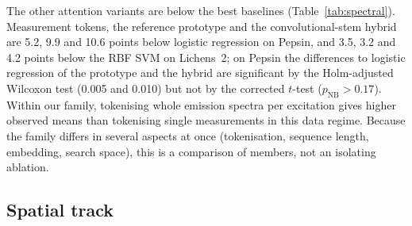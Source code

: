 \documentclass[journal]{IEEEtran}
\begin{document}
\begin{table}[!t]
\centering
\caption{Paired comparison of our attention variants and baselines, one block per dataset and track. First rows of each block: every attention variant against the strongest baseline (Holm across variants). Remaining rows: our best variant (marked $^*$, selected on the test units, hence optimistic) against every other baseline (Holm across baselines). $n$: units; $\bar d$: mean difference in balanced accuracy in points with bootstrap 95\% CI; W/T/L: wins, ties, losses; $p_{\mathrm{W}}$: Wilcoxon $p$ (unadjusted), $p_{\mathrm{NB}}$: Nadeau--Bengio corrected $t$-test $p$ (unadjusted), $p_{\mathrm{W}}^{\mathrm{Holm}}$: Holm-adjusted Wilcoxon $p$. With $n=4$ the smallest attainable two-sided Wilcoxon $p$ is 0.125.}
\label{tab:stats}
\scriptsize
\setlength{\tabcolsep}{3pt}

\end{table}

The other attention variants are below the best baselines (Table~\ref{tab:spectral}). Measurement tokens, the reference prototype and the convolutional-stem hybrid are 5.2, 9.9 and 10.6 points below logistic regression on Pepsin, and 3.5, 3.2 and 4.2 points below the RBF SVM on Lichens~2; on Pepsin the differences to logistic regression of the prototype and the hybrid are significant by the Holm-adjusted Wilcoxon test (0.005 and 0.010) but not by the corrected $t$-test ($p_{\mathrm{NB}}>0.17$). Within our family, tokenising whole emission spectra per excitation gives higher observed means than tokenising single measurements in this data regime. Because the family differs in several aspects at once (tokenisation, sequence length, embedding, search space), this is a comparison of members, not an isolating ablation.

\subsection{Spatial track}
\begin{table}[!t]
\centering
\caption{Oracle-masked spatial track: balanced accuracy (\%), mean $\pm$ std over units (6, 4 and 4). Patch size $P$ is tuned in $\{5,7\}$. All spatial models use annotation-derived component boundaries when constructing patches. Best per column is bold and second best is underlined. The $\Delta$ row is descriptive and compares the highest-mean proposed spatial model with the highest-mean baseline.}
\label{tab:spatial}

\end{table}
\end{document}
